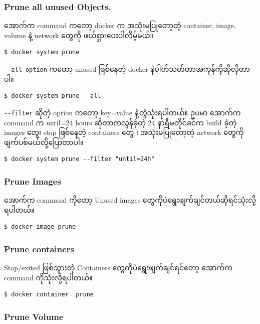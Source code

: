 \documentclass{article}
\begin{document}
\subsubsection{Prune all unused
Objects.}\label{prune-all-unused-objects.}

အောက်က command ကတော့ docker က အသုံးမပြုတော့တဲ့ container, image, volume
နဲ့ network တွေကို ဖယ်ရှားပေးပါလိမ့်မယ်။

\begin{verbatim}
$ docker system prune
\end{verbatim}

\texttt{-{}-‌all option} ကတော့ unused ဖြစ်နေတဲ့ docker
နဲ့ပါတ်သတ်တာအကုန်ကိုဆိုလိုတာပါ။

\begin{verbatim}
$ docker system prune --all
\end{verbatim}

\texttt{-{}-filter} ဆိုတဲ့ option ကတော့ key=value နဲ့တွဲသုံးရပါတယ်။ ဥပမာ
အောက်က command က until=24 hours ဆိုတာကလွန်ခဲ့တဲ့ 24 နာရီမတိုင်ခင်က build
ခဲ့တဲ့ images တွေ၊ stop ဖြစ်နေတဲ့ containers တွေ ၊ အသုံးမပြုတော့တဲ့
network တွေကိုဖျက်ပစ်မယ်လို့ပြောတာပါ။

\begin{verbatim}
$ docker system prune --filter "until=24h"
\end{verbatim}

\subsubsection{Prune Images}\label{prune-images}

အောက်က command ကိုတော့ Unused images
တွေကိုပဲရွေးဖျက်ချင်တယ်ဆိုရင်သုံးလို့ရပါတယ်။

\begin{verbatim}
$ docker image prune
\end{verbatim}

\subsubsection{Prune containers}\label{prune-containers}

Stop/exited ဖြစ်သွားတဲ့ Containers တွေကိုပဲရွေးဖျက်ချင်ရင်တော့ အောက်က
command ကိုသုံးလို့ရပါတယ်။

\begin{verbatim}
$ docker container  prune
\end{verbatim}

\subsubsection{Prune Volume}\label{prune-volume}
\end{document}
